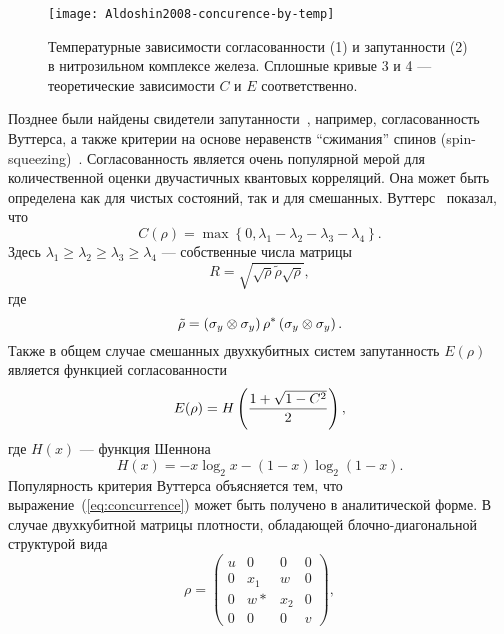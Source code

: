 \begin{figure}[H]
    \centering
    \texttt{[image: Aldoshin2008-concurence-by-temp]}
    \caption{
      Температурные зависимости согласованности (1) и запутанности (2) в     нитрозильном комплексе железа.
      Сплошные кривые 3 и 4 --- теоретические зависимости $C$ и $E$ соответственно.
    }
    \label{fig:concurence-temp-rcr}
\end{figure}

Позднее были найдены свидетели запутанности~\cite{Wootters1998, Bourennane2004, Kaszlikowski2008, Krammer2009, Bancal2011},
например, согласованность Вуттерса,
а также критерии на основе неравенств ``сжимания'' спинов (spin-squeezing)~\cite{Sorensen2001, Durkin2005, Vitagliano2011, Duan2011}.
Согласованность является очень популярной мерой для количественной оценки двучастичных квантовых корреляций.
Она может быть определена как для чистых состояний,
так и для смешанных.
Вуттерс~\cite{Wootters1998} показал, что
%
\begin{equation}\label{eq:concurrence}
  C(\rho)
  = \max\left\{0, \lambda_1 - \lambda_2  - \lambda_3  - \lambda_4\right\}.
\end{equation}
%
Здесь $\lambda_1 \geq \lambda_2 \geq \lambda_3 \geq \lambda_4$ --- собственные числа матрицы
%
\begin{equation}
  R = \sqrt{\sqrt{\rho}\tilde{\rho}\sqrt{\rho}},
\end{equation}
где
%
\begin{equation}
  \tilde\rho = \left( \sigma_y \otimes \sigma_y \right)
    \rho^* \left( \sigma_y \otimes \sigma_y \right).
\end{equation}
%
Также в общем случае смешанных двухкубитных систем запутанность $E(\rho)$ является функцией согласованности
\begin{equation}
  E(\rho) = H\left( \dfrac{1 + \sqrt{1 - C^2}}{2} \right),
\end{equation}
%
где $H(x)$ --- функция Шеннона~\cite{Shannon1948}
%
\begin{equation}
  H(x) = -x \log_2 x - (1 - x)\log_2(1 - x).
\end{equation}
%
Популярность критерия Вуттерса объясняется тем,
что выражение~(\ref{eq:concurrence}) может быть получено в аналитической форме.
В случае двухкубитной матрицы плотности, обладающей блочно-диагональной структурой вида
%
\begin{equation}
  \rho = \begin{pmatrix}
    u &  0  &  0  & 0 \\
    0 & x_1 &  w  & 0 \\
    0 &  w* & x_2 & 0 \\
    0 &  0  &  0  & v
  \end{pmatrix},
\end{equation}
